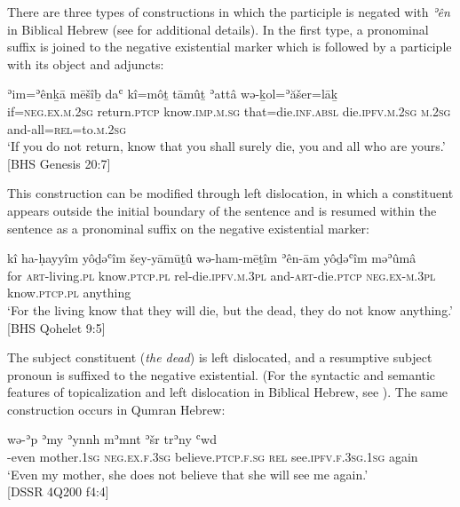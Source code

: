 \documentclass[output=paper,colorlinks,citecolor=brown,draft,draftmode]{langscibook}
\begin{document}
There are three types of constructions in which the participle is negated
with \textit{ʾên} in Biblical Hebrew  (see \citeauthor{MillerNaude2015}
\citeyear{MillerNaude2015}
for additional
details). In the first type, a pronominal suffix is
joined to the negative existential marker which is followed by a participle
with its object and adjuncts:
%
\begin{exe}\ex \label{ex:heb-you-die}
    \gll ʾim=ʾênḵā mēšîḇ daʿ kî=môṯ tāmûṯ ʾattâ wə-ḵol=ʾăšer=lāḵ \\
    if=\textsc{neg.ex.m.2sg} return.\textsc{ptcp} know.\textsc{imp.m.sg}
  that=die\textsc{.inf.absl}   die.\textsc{ipfv.m.2sg} \textsc{m.2sg}
  and-all=\textsc{rel}=to.\textsc{m.2sg}  \\
    \glt `If you do not return, know that you shall surely die, you and all who
are yours.' [BHS Genesis 20:7]
    \end{exe}
%
This construction can be modified through left dislocation, in which a constituent appears outside the initial boundary of the sentence and is resumed within the sentence as a pronominal suffix on the negative existential marker:
%
\largerpage
\begin{exe}\ex \label{ex:heb-dead}
    \gll kî ha-ḥayyîm  yôḏǝʿîm    šey-yāmūṯû wə-ham-mēṯîm ʾên-ām yôḏǝʿîm
    məʾûmâ       \\ 
    for \textsc{art}-living.\textsc{pl} know.\textsc{ptcp.pl}
    rel-die.\textsc{ipfv.m.3pl} and-\textsc{art}-die.\textsc{ptcp}
    \textsc{neg.ex}-\textsc{m.3pl} know.\textsc{ptcp.pl} anything \\
    \glt `For the living know that they will die, but the dead, they do not   know
anything.' [BHS Qohelet 9:5]
    \end{exe}
\newpage
\noindent
The subject constituent (\textit{the dead}) is left dislocated, and a
resumptive subject pronoun is suffixed to the negative existential. (For
the syntactic and semantic features of topicalization and left dislocation
in Biblical Hebrew, see \cites{Naude1990}{Holmstedt2014}{NaudeMiller2017}). The same construction occurs in
Qumran Hebrew:
%
\begin{exe}\ex \label{ex:heb-my-mother}
    \gll {\ob}wə{\cb}-ʾp    ʾmy    ʾynnh    mʾmnt ʾšr trʾn{\ob}y{\cb} ʿwd\\
    [and]-even   mother.\textsc{1sg}    \textsc{neg.ex.f.3sg}
    believe.\textsc{ptcp.f.sg} \textsc{rel}   see.\textsc{ipfv.f.3sg.1sg}
    again\\
    \glt `Even my mother, she does not believe that she will see me
    again.'\\
             [DSSR 4Q200 f4:4]
    \end{exe}
\end{document}
